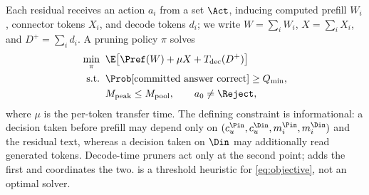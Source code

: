 Each residual receives an action $a_i$ from a set $\Act$, inducing computed prefill $W_i$, connector tokens $X_i$, and decode tokens $d_i$; we write $W{=}\sum_iW_i$, $X{=}\sum_iX_i$, and $D^{+}{=}\sum_id_i$.
A pruning policy $\pi$ solves
\begin{equation}
\label{eq:objective}
\begin{aligned}
\min_{\pi}\;\; & \E\bigl[\Pref(W)+\mu X+T_{\mathrm{dec}}(D^{+})\bigr]\\
\text{s.t.}\;\; & \Prob[\text{committed answer correct}]\ge Q_{\min},\\
& M_{\mathrm{peak}}\le M_{\mathrm{pool}},\qquad a_0\neq\Reject,
\end{aligned}
\end{equation}
where $\mu$ is the per-token transfer time.
The defining constraint is informational: a decision taken before prefill may depend only on $(c_u^{\Pin},c_u^{\Din},m_i^{\Pin},m_i^{\Din})$ and the residual text, whereas a decision taken on $\Din$ may additionally read generated tokens.
Decode-time pruners act only at the second point; \sys adds the first and coordinates the two.
\sys is a threshold heuristic for \eqref{eq:objective}, not an optimal solver.
